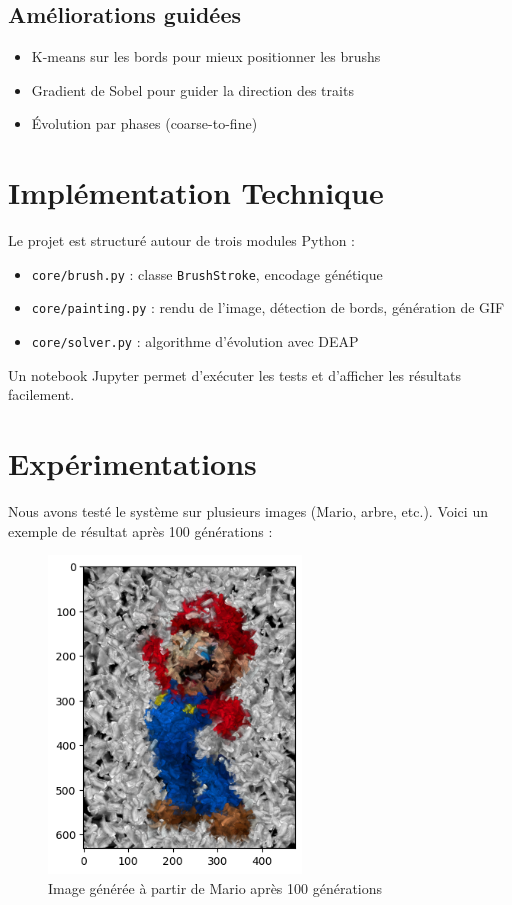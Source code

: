 \documentclass[11pt,a4paper]{article}
\begin{document}
\subsection{Améliorations guidées}
\begin{itemize}
    \item K-means sur les bords pour mieux positionner les brushs
    \item Gradient de Sobel pour guider la direction des traits
    \item Évolution par phases (coarse-to-fine)
\end{itemize}

\section{Implémentation Technique}
Le projet est structuré autour de trois modules Python :
\begin{itemize}
    \item \texttt{core/brush.py} : classe \texttt{BrushStroke}, encodage génétique
    \item \texttt{core/painting.py} : rendu de l'image, détection de bords, génération de GIF
    \item \texttt{core/solver.py} : algorithme d'évolution avec DEAP
\end{itemize}

Un notebook Jupyter permet d'exécuter les tests et d'afficher les résultats facilement.

\section{Expérimentations}
Nous avons testé le système sur plusieurs images (Mario, arbre, etc.). Voici un exemple de résultat après 100 générations :

\begin{figure}[H]
    \centering
    \includegraphics[width=0.6\textwidth]{images/mario_result.png}
    \caption{Image générée à partir de Mario après 100 générations}
\end{figure}
\end{document}
